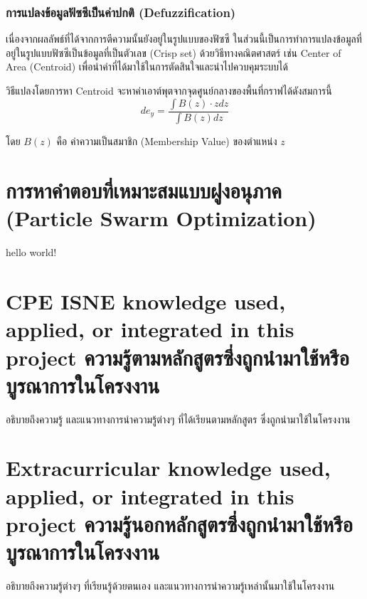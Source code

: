 \subsubsection{การแปลงข้อมูลฟัซซีเป็นค่าปกติ (Defuzzification)}
เนื่องจากผลลัพธ์ที่ได้จากการตีความนั้นยังอยู่ในรูปแบบของฟัซซี ในส่วนนี้เป็นการทำการแปลงข้อมูลที่อยู่ในรูปแบบฟัซซีเป็นข้อมูลที่เป็นตัวเลข (Crisp set) ด้วยวิธีทางคณิตศาสตร์ เช่น Center of Area (Centroid) เพื่อนำค่าที่ได้มาใช้ในการตัดสินใจและนำไปควบคุมระบบได้

วิธีแปลงโดยการหา Centroid จะหาค่าเอาต์พุตจากจุดศูนย์กลางของพื้นที่กราฟได้ดังสมการนี้
\begin{equation}
  de_y = \frac{\int B(z)\cdot zdz}{\int B(z)dz}
\end{equation}

โดย \(B(z)\) คือ ค่าความเป็นสมาชิก (Membership Value) ของตำแหน่ง \(z\)

\section{การหาคำตอบที่เหมาะสมแบบฝูงอนุภาค (Particle Swarm Optimization)}
hello world!

\section{\ifenglish%
\ifcpe CPE \else ISNE \fi knowledge used, applied, or integrated in this project
\else%
ความรู้ตามหลักสูตรซึ่งถูกนำมาใช้หรือบูรณาการในโครงงาน
\fi
}

อธิบายถึงความรู้ และแนวทางการนำความรู้ต่างๆ ที่ได้เรียนตามหลักสูตร ซึ่งถูกนำมาใช้ในโครงงาน

\section{\ifenglish%
Extracurricular knowledge used, applied, or integrated in this project
\else%
ความรู้นอกหลักสูตรซึ่งถูกนำมาใช้หรือบูรณาการในโครงงาน
\fi
}

อธิบายถึงความรู้ต่างๆ ที่เรียนรู้ด้วยตนเอง และแนวทางการนำความรู้เหล่านั้นมาใช้ในโครงงาน
